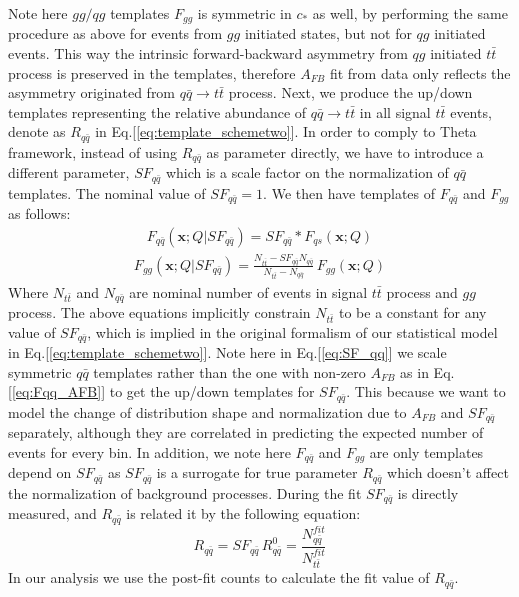 \documentclass{cmspaperpdf}
\begin{document}
Note here $gg/qg$ templates $F_{gg}$ is symmetric in $c_*$ as well, by performing the same procedure as above for events from $gg$ initiated states, but not for $qg$ initiated events. This way the intrinsic forward-backward asymmetry from $qg$ initiated $t\bar{t}$ process is preserved in the templates, therefore $A_{FB}$ fit from data only reflects  the asymmetry originated from $q\bar{q}\rightarrow t\bar{t}$ process.
Next, we produce the up/down templates representing the relative abundance of $q\bar{q}\rightarrow t\bar{t}$ in all signal $t\bar{t}$ events, denote as $R_{q\bar{q}}$ in Eq.[\ref{eq:template_schemetwo}]. In order to comply to Theta framework, instead of using $R_{q\bar{q}}$ as parameter directly,  we have to introduce a different parameter, $SF_{q\bar{q}}$ which is a scale factor on the normalization of $q\bar{q}$ templates. The nominal value of $SF_{q\bar{q}} = 1$. We then have templates of $F_{q\bar{q}}$ and $F_{gg}$ as follows:
\begin{align}
\label{eq:SF_qq}
F_{q\bar{q}}(\bm{x};Q|SF_{q\bar{q}})=SF_{q\bar{q}} * F_{qs}(\bm{x};Q) 
\end{align}
\begin{align}
F_{gg}(\bm{x};Q|SF_{q\bar{q}})=\frac{N_{t\bar{t}}-SF_{q\bar{q}}N_{q\bar{q}}}{N_{t\bar{t}}-N_{q\bar{q}}}\, F_{gg}(\bm{x};Q)
\end{align} 
Where $N_{t\bar{t}}$ and $N_{q\bar{q}}$ are nominal number of events in signal $t\bar{t}$ process and $gg$ process. The above equations implicitly constrain $N_{t\bar{t}}$ to be a constant for any value of $SF_{q\bar{q}}$, which is implied in the original formalism of our statistical model in Eq.[\ref{eq:template_schemetwo}]. Note here in Eq.[\ref{eq:SF_qq}] we scale symmetric $q\bar{q}$ templates rather than the one with non-zero $A_{FB}$ as in Eq.[\ref{eq:Fqq_AFB}] to get the up/down templates for $SF_{q\bar{q}}$. This because we want to model the change of distribution shape and normalization due to $A_{FB}$ and $SF_{q\bar{q}}$ separately, although they are correlated in predicting the expected number of events for every bin. 
In addition, we note here $F_{q\bar{q}}$ and $F_{gg}$ are only templates depend on $SF_{q\bar{q}}$ as $SF_{q\bar{q}}$ is a surrogate for true parameter $R_{q\bar{q}}$ which doesn't affect the normalization of background processes. During the fit $SF_{q\bar{q}}$  is directly measured, and $R_{q\bar{q}}$ is related it by the following equation:
\begin{equation}
R_{q\bar{q}} = SF_{q\bar{q}}\,R_{q\bar{q}}^0 = \frac{N_{q\bar{q}}^{fit}}{N_{t\bar{t}}^{fit}}
\end{equation}
In our analysis we use the post-fit counts to calculate the fit value of $R_{q\bar{q}}$.
\end{document}

